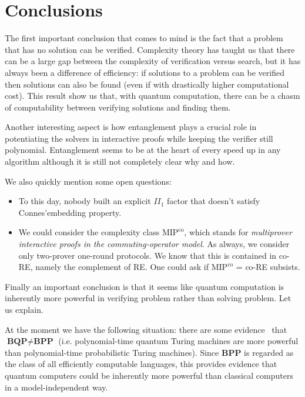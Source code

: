 \section*{Conclusions}

The first important conclusion that comes to mind is the fact that a problem that has no solution can be verified. Complexity theory has taught us that there can be a large gap between the complexity of verification versus search, but it has always been a difference of efficiency: if solutions to a problem can be verified then solutions can also be found (even if with drastically higher computational cost). This result show us that, with quantum computation, there can be a chasm of computability between verifying solutions and finding them.

\quad 

Another interesting aspect is how entanglement plays a crucial role in potentiating the solvers in interactive proofs while keeping the verifier still polynomial. Entanglement seems to be at the heart of every speed up in any algorithm although it is still not completely clear why and how.

\quad 

We also quickly mention some open questions:
\begin{itemize}

    \item To this day, nobody built an explicit $II_1$ factor that doesn't satisfy Connes'embedding property.
    \item We could consider the complexity class $\text{MIP}^\text{co}$, which stands for \emph{multiprover interactive proofs in the commuting-operator model}. As always, we consider only two-prover one-round protocols. We know that this is contained in co-RE, namely the complement of RE. One could ask if $\text{MIP}^\text{co}$ = co-RE subsists.
    
\end{itemize}

\quad 

Finally an important conclusion is that it seems like quantum computation is inherently more powerful in verifying problem rather than solving problem. Let us explain.

At the moment we have the following situation: there are some evidence~\cite{Bennett_1997} that $\textbf{BQP} \neq \textbf{BPP}$ (i.e. polynomial-time quantum Turing machines are more powerful than polynomial-time probabilistic Turing machines). Since \textbf{BPP} is regarded as the class of all efficiently computable languages, this provides evidence that quantum computers could be inherently more powerful than classical computers in a model-independent way.

